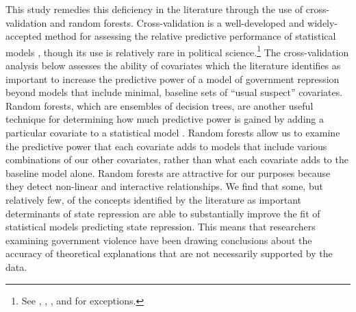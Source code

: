 \documentclass[12pt]{article}
\begin{document}
This study remedies this deficiency in the literature through the use of cross-validation and random forests. Cross-validation is a well-developed and widely-accepted method for assessing the relative predictive performance of statistical models \citep[See, e.g.,][]{Geisser1975, Efron1983, PicardCook1984, HastieTibshiraniFriedman2008}, though its use is relatively rare in political science.\footnote{See \citet{HoffWard2004}, \citet{WardHoff2007}, \citet{WardSiversonCao2007}, and \citet{Wardetal2010} for exceptions.} The cross-validation analysis below assesses the ability of covariates which the literature identifies as important to increase the predictive power of a model of government repression beyond models that include minimal, baseline sets of ``usual suspect'' covariates. Random forests, which are ensembles of decision trees, are another useful technique for determining how much predictive power is gained by adding a particular covariate to a statistical model \citep{breiman2001random}. Random forests allow us to examine the predictive power that each covariate adds to models that include various combinations of our other covariates, rather than what each covariate adds to the baseline model alone. Random forests are attractive for our purposes because they detect non-linear and interactive relationships. We find that some, but relatively few, of the concepts identified by the literature as important determinants of state repression are able to substantially improve the fit of statistical models predicting state repression. This means that researchers examining government violence have been drawing conclusions about the accuracy of theoretical explanations that are not necessarily supported by the data. 
\end{document}
